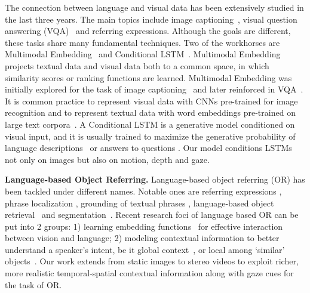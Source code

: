 \documentclass[10pt,twocolumn,letterpaper]{article}
\begin{document}

The connection between language and visual data has been extensively
studied in the last three years. The main topics include image
captioning~\cite{deep:semantic:alignment:cvpr15, show:attend:tell,
  caption:back}, visual question answering
(VQA)~\cite{exploraing:models:data:vqa, VQA, andreas2016learning} and
referring expressions. Although the goals are different, these tasks
share many fundamental techniques. Two of the workhorses are
Multimodal Embedding~\cite{frome2013devise,
  deep:semantic:alignment:cvpr15, multimodal:pooling} and Conditional
LSTM~\cite{densecap:cvpr16, rohrbach2016grounding, yu2016modeling,
  mao2016generation}.  Multimodal Embedding projects textual data and
visual data both to a common space, in which similarity scores or
ranking functions are learned.
Multimodal Embedding was initially explored for the task of image captioning~\cite{frome2013devise, long-term:recurrent, deep:semantic:alignment:cvpr15} and later reinforced in VQA~\cite{exploraing:models:data:vqa,ask:your:neurons,multimodal:pooling}. 
It is common practice to represent visual data with CNNs pre-trained  for image recognition and to represent textual data with word embeddings pre-trained on large text corpora~\cite{glove}. A Conditional LSTM is a generative model conditioned on visual input, and it is usually trained to maximize the generative probability of language descriptions~\cite{hu2016natural,mao2016generation} or answers to questions \cite{VQA,exploraing:models:data:vqa}. %
Our model conditions LSTMs not only on images but also on motion, depth and gaze.    

\bigskip
\noindent
\textbf{Language-based Object Referring.}
Language-based object referring (OR) has been tackled under different names.  
Notable ones are referring expressions \cite{yu2016modeling,mao2016generation}, phrase localization \cite{phloc,wang2016structured}, grounding of textual phrases \cite{rohrbach2016grounding}, language-based object retrieval~\cite{hu2016natural} and segmentation~\cite{hu2016segmentation}. 
Recent research foci of language based OR can be put into 2 groups: 1) learning embedding functions~\cite{multimodal:pooling,deep:semantic:alignment:cvpr15} for effective interaction between vision and language; 2) modeling contextual information to better understand a speaker's intent, be it global context~\cite{mao2016generation,hu2016natural}, or local among `similar' objects~\cite{Nagaraja2016,yu2016modeling,mao2016generation}. Our work extends \cite{hu2016natural} from static images to stereo videos to exploit richer, more realistic temporal-spatial contextual information along with gaze cues for the task of OR.  
\end{document}
